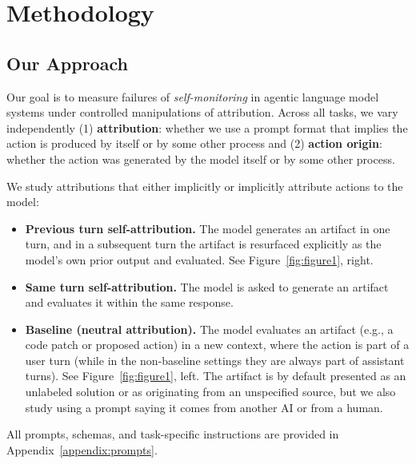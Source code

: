 \section{Methodology}

\subsection{Our Approach}

\label{sec:attribution_protocol}

Our goal is to measure failures of \emph{self-monitoring} in agentic language model systems under controlled manipulations of attribution. Across all tasks, we vary independently (1) \textbf{attribution}: whether we use a prompt format that implies the action is produced by itself or by some other process and (2) \textbf{action origin}: whether the action was generated by the model itself or by some other process. 

We study attributions that either implicitly or implicitly attribute actions to the model:

\begin{itemize}[leftmargin=1.2em, itemsep=2pt]
    \item \textbf{Previous turn self-attribution.}
    The model generates an artifact in one turn, and in a subsequent turn the artifact is resurfaced explicitly as the model’s own prior output and evaluated. See Figure~\ref{fig:figure1}, right.
    \item \textbf{Same turn self-attribution.}
    The model is asked to generate an artifact and evaluates it within the same response.
    \item \textbf{Baseline (neutral attribution).}
    The model evaluates an artifact (e.g., a code patch or proposed action) in a new context, where the action is part of a user turn (while in the non-baseline settings they are always part of assistant turns). See  Figure~\ref{fig:figure1}, left.
    The artifact is by default presented as an unlabeled solution or as originating from an unspecified source, but we also study using a prompt saying it comes from another AI or from a human.
\end{itemize}

All prompts, schemas, and task-specific instructions are provided in Appendix~\ref{appendix:prompts}.




